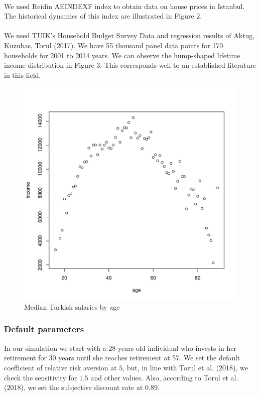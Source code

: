 \documentclass[]{article}
\begin{document}
\paragraph{}We used Reidin AEINDEXF index to obtain data on house prices in Istanbul. The historical dynamics of this index are illustrated in Figure 2.

\paragraph{}We used TUIK's Household Budget Survey Data and regression results of Aktug, Kuzubas, Torul (2017). We have 55 thousand panel data points for 170 households for 2001 to 2014 years. We can observe the hump-shaped lifetime income distribution in Figure 3. This corresponds well to an established literature in this field.

\begin{figure}[h]
	\centering
	\includegraphics[scale=0.6]{figs/wage2median.pdf}
	\caption{Median Turkish salaries by age}
\end{figure}

\subsubsection{Default parameters}
In our simulation we start with a 28 years old individual who invests in her retirement for 30 years until she reaches retirement at 57. We set the default coefficient of relative risk aversion at $5$, but, in line with Torul et al. (2018), we check the sensitivity for $1.5$ and other values. Also, according to Torul et al. (2018), we set the subjective discount rate at $0.89$.
\end{document}
